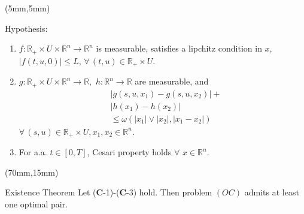 \begin{frame}[plain]
	\begin{textblock*}{60mm}(5mm,5mm)
		\begin{graybox}{Hypothesis:}
			\begin{enumerate}[(\textbf{{C}}-1)]
				\item
					$
					f:\mathbb{R}_{+}\times U
					\times \mathbb{R}^n\rightarrow 
					\mathbb{R}^n
					$ is measurable, satisfies a lipchitz
					condition in $x$,
					$
					|f(t,u,0)|\leq L,\,
					\forall\,(t,u)\in
					\mathbb{R}_{+}\times U .
					$
				\item
					$
					g:\mathbb{R}_{+}\times U\times 
					\mathbb{R}^n\rightarrow \mathbb{R},
					$ 
					$
					h:\mathbb{R}^n\rightarrow \mathbb{R}
					$ are measurable, and
					\begin{align*}
					&|g(s,u,x_1)-g(s,u,x_2)|+\\
					&|h(x_1)-h(x_2)|\\
					&\leq \omega(|x_1|\vee |x_2|,|x_1-x_2|)
					\end{align*}
					$
					\forall\, (s,u)\in \mathbb{R}_{+}
					\times U,x_1,x_2\in \mathbb{R}^n
					$.
				\item
					For a.a. $t\in[0,T]$, Cesari property holds $\forall$ $x\in \mathbb{R}^n$.
			\end{enumerate}	
		\end{graybox}
	\end{textblock*}


	
	\begin{textblock*}{55mm}(70mm,15mm)
		\begin{graybox}{Existence Theorem}
			Let ($\mathbf{C}$-1)-($\mathbf{C}$-3) hold. Then problem $(OC)$ admits at least one optimal pair.
		\end{graybox}
	\end{textblock*}
\end{frame}

